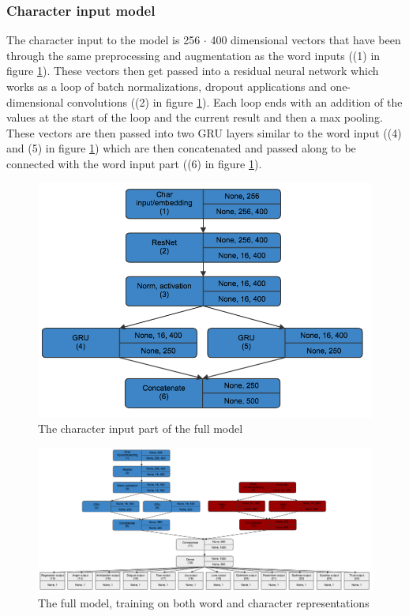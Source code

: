 \subsubsection{Character input model}
The character input to the model is 256 $\cdot$ 400 dimensional vectors that have been through the same preprocessing and augmentation as the word inputs ((1) in figure \ref{fig:charmodel}). These vectors then get passed into a residual neural network which works as a loop of batch normalizations, dropout applications and one-dimensional convolutions ((2) in figure \ref{fig:charmodel}). Each loop ends with an addition of the values at the start of the loop and the current result and then a max pooling. These vectors are then passed into two GRU layers similar to the word input ((4) and (5) in figure \ref{fig:charmodel}) which are then concatenated and passed along to be connected with the word input part ((6) in figure \ref{fig:charmodel}).
\begin{figure}[H]
	\centering
		\includegraphics[scale=0.25]{pictures/char_model.png}
		\caption{The character input part of the full model}
		\label{fig:charmodel}
\end{figure}
\begin{figure}[H]
    \centering
        \includegraphics[width=\textwidth]{pictures/model.png}
        \caption{The full model, training on both word and character representations}
        \label{fig:fullmodel}
\end{figure}

